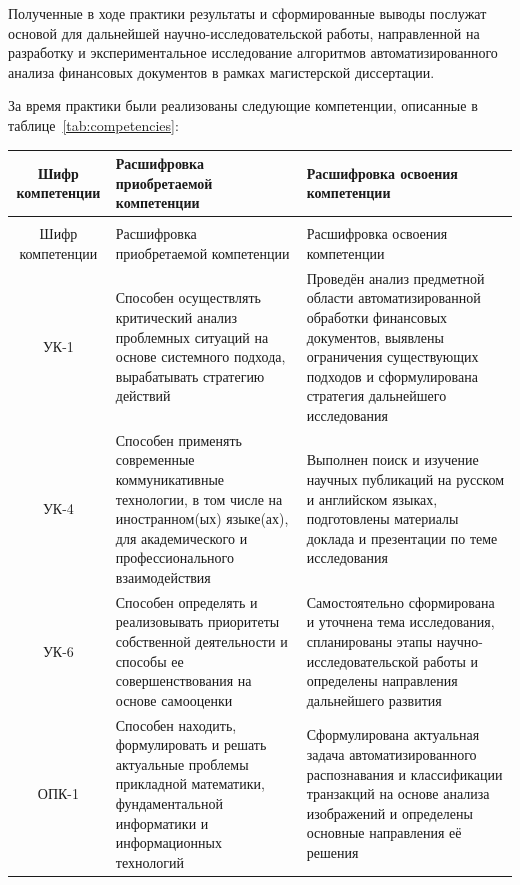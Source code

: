 \documentclass[14pt,a4paper]{extarticle}
\begin{document}
Полученные в ходе практики результаты и сформированные выводы послужат основой для дальнейшей научно-исследовательской работы, направленной на разработку и экспериментальное исследование алгоритмов автоматизированного анализа финансовых документов в рамках магистерской диссертации.

За время практики были реализованы следующие компетенции, описанные в таблице~\ref{tab:competencies}:

\begin{tabularx}{\textwidth}{|C|X|X|}

\caption{Реализованные компетенции.} \label{tab:competencies} \\

\hline
Шифр компетенции & Расшифровка приобретаемой компетенции & Расшифровка освоения компетенции \\ \hline
\endfirsthead

\caption{Реализованные компетенции.} \\
\hline
Шифр компетенции & Расшифровка приобретаемой компетенции & Расшифровка освоения компетенции \\ \hline
\endhead

УК-1 & Способен осуществлять критический анализ проблемных ситуаций на основе системного подхода, вырабатывать стратегию действий & Проведён анализ предметной области автоматизированной обработки финансовых документов, выявлены ограничения существующих подходов и сформулирована стратегия дальнейшего исследования \\ \hline

УК-4 & Способен применять современные коммуникативные технологии, в том числе на иностранном(ых) языке(ах), для академического и профессионального взаимодействия & Выполнен поиск и изучение научных публикаций на русском и английском языках, подготовлены материалы доклада и презентации по теме исследования \\ \hline

УК-6 & Способен определять и реализовывать приоритеты собственной деятельности и способы ее совершенствования на основе самооценки & Самостоятельно сформирована и уточнена тема исследования, спланированы этапы научно-исследовательской работы и определены направления дальнейшего развития \\ \hline

ОПК-1 & Способен находить, формулировать и решать актуальные проблемы прикладной математики, фундаментальной информатики и информационных технологий & Сформулирована актуальная задача автоматизированного распознавания и классификации транзакций на основе анализа изображений и определены основные направления её решения \\ \hline


\end{tabularx}
\end{document}

